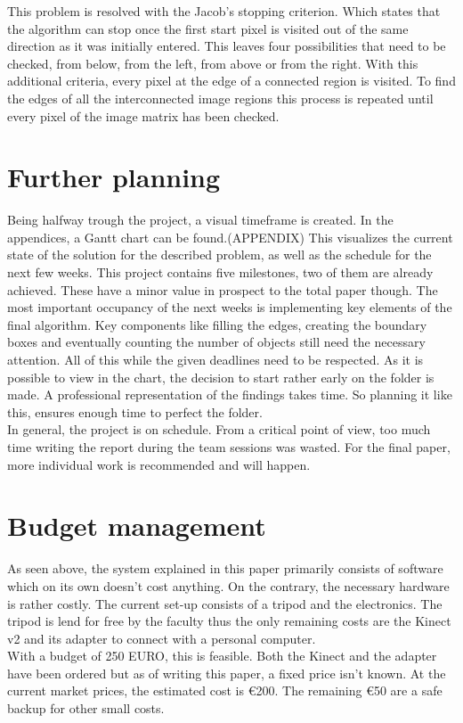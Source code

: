 \documentclass[11pt]{article}
\begin{document}
\noindent This problem is resolved with the Jacob's stopping criterion. Which states that the algorithm can stop once the first start pixel is visited out of the same direction as it was initially entered. This leaves four possibilities that need to be checked, from below, from the left, from above or from the right. With this additional criteria, every pixel at the edge of a connected region is visited. 
To find the edges of all the interconnected image regions this process is repeated until every pixel of the image matrix has been checked. 

\section{Further planning}

Being halfway trough the project, a visual timeframe is created. In the appendices, a Gantt chart can be found.(APPENDIX) 
This visualizes the current state of the solution for the described problem, as well as the schedule for the next few weeks. 
This project contains five milestones, two of them are already achieved. These have a minor value in prospect to the total paper though. The most important occupancy of the next weeks is implementing key elements of the final algorithm. Key components like filling the edges, creating the boundary boxes and eventually counting the number of objects still need the necessary attention. All of this while the given deadlines need to be respected. As it is possible to view in the chart, the decision to start rather early on the folder is made. A professional representation of the findings takes time. So planning it like this, ensures enough time to perfect the folder. \\
In general, the project is on schedule. From a critical point of view, too much time writing the report during the team sessions was wasted. For the final paper, more individual work is recommended and will happen.

\section{Budget management}

As seen above, the system explained in this paper primarily consists of software which on its own doesn't cost anything. On the contrary, the necessary hardware is rather costly. The current set-up consists of a tripod and the electronics. The tripod is lend for free by the faculty thus the only remaining costs are the Kinect v2 and its adapter to connect with a personal computer.\\
With a budget of 250 EURO, this is feasible. Both the Kinect and the adapter have been ordered but as of writing this paper, a fixed price isn't known. At the current market prices, the estimated cost is \euro 200. The remaining \euro 50 are a safe backup for other small costs.
\end{document}
